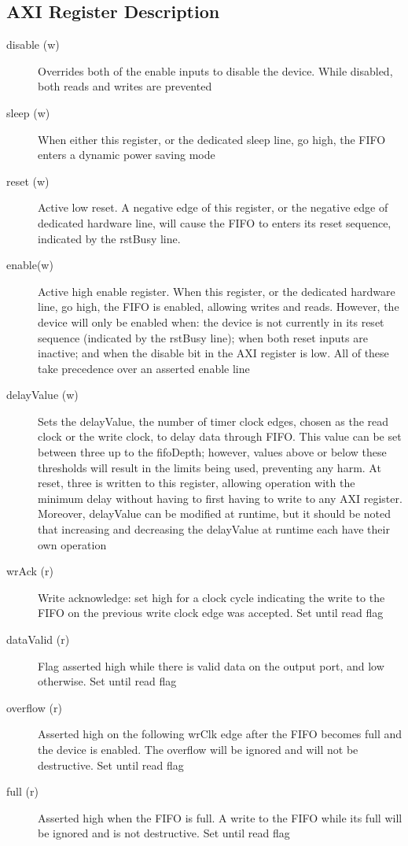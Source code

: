 \documentclass[11pt]{article}
\begin{document}
\subsection{AXI Register Description}
\begin{description}
	\item[disable (w)]Overrides both of the enable inputs to disable the device. While disabled, both reads and writes are prevented
	\item[sleep (w)]When either this register, or the dedicated sleep line, go high, the FIFO enters a dynamic power saving mode
	\item[reset (w)]Active low reset. A negative edge of this register, or the negative edge of dedicated hardware line, will cause the
		FIFO to enters its reset sequence, indicated by the rstBusy line.
	\item[enable(w)]Active high enable register. When this register, or the dedicated hardware line, go high, the FIFO is enabled, allowing writes and
		reads. However, the device will only be enabled when: the device is not currently in its reset sequence (indicated by the rstBusy line); when both
		reset inputs are inactive; and when the disable bit in the AXI register is low. All of these take precedence over an asserted enable line
	\item[delayValue (w)]Sets the delayValue, the number of timer clock edges, chosen as the read clock or the write clock, to delay data through FIFO.
		This value can be set between three up to the fifoDepth; however, values above or below these thresholds will result in the limits being used, 
		preventing any harm. At reset, three is written to this register, allowing operation with the minimum delay without having to first
		having to write to any AXI register. Moreover, delayValue can be modified at runtime, but it should be noted that increasing and decreasing the
		delayValue at runtime each have their own operation
	\item[wrAck (r)]Write acknowledge: set high for a clock cycle indicating the write to the FIFO on the previous write clock edge was accepted.
		Set until read flag
	\item[dataValid (r)]Flag asserted high while there is valid data on the output port, and low otherwise. Set until read flag
	\item[overflow (r)]Asserted high on the following wrClk edge after the FIFO becomes full and the device is enabled. The overflow will be ignored and
		will not be destructive. Set until read flag
	\item[full (r)]Asserted high when the FIFO is full. A write to the FIFO while its full will be ignored and is not destructive. Set until read flag

\end{description}
\end{document}
